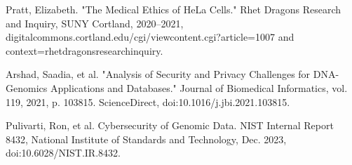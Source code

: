 \documentclass[12pt]{article}
\begin{document}
Pratt, Elizabeth. "The Medical Ethics of HeLa Cells." Rhet Dragons Research and Inquiry, SUNY Cortland, 2020–2021, digitalcommons.cortland.edu/cgi/viewcontent.cgi?article=1007 and context=rhetdragonsresearchinquiry.

Arshad, Saadia, et al. "Analysis of Security and Privacy Challenges for DNA-Genomics Applications and Databases." Journal of Biomedical Informatics, vol. 119, 2021, p. 103815. ScienceDirect, doi:10.1016/j.jbi.2021.103815.

Pulivarti, Ron, et al. Cybersecurity of Genomic Data. NIST Internal Report 8432, National Institute of Standards and Technology, Dec. 2023, doi:10.6028/NIST.IR.8432.
\end{document}
